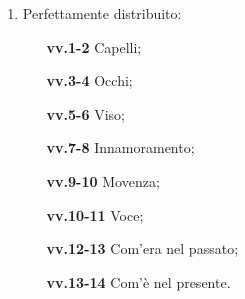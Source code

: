\documentclass{article}
\begin{document}
\begin{enumerate}
        \item Perfettamente distribuito:
                \begin{itemize}
                    \item[\textbf{vv.1-2}] Capelli;
                    \item[\textbf{vv.3-4}] Occhi;
                    \item[\textbf{vv.5-6}] Viso;
                    \item[\textbf{vv.7-8}] Innamoramento;
                    \item[\textbf{vv.9-10}] Movenza;
                    \item[\textbf{vv.10-11}] Voce;
                    \item[\textbf{vv.12-13}] Com'era nel passato;
                    \item[\textbf{vv.13-14}] Com'è nel presente.
                \end{itemize}
\end{enumerate}

\newpage
\end{document}
